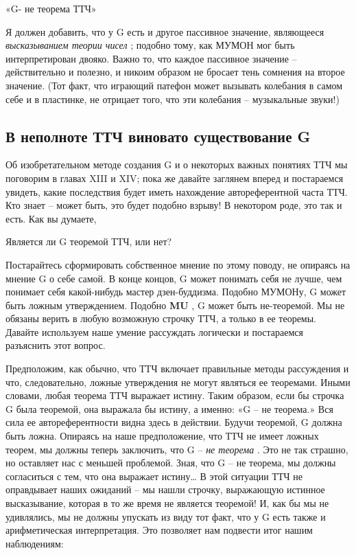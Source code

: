 \documentclass[../main.tex]{subfiles}
\begin{document}
«G- не теорема ТТЧ»

Я должен добавить, что у G есть и другое пассивное значение, являющееся \emph{высказыванием теории чисел} ; подобно тому, как МУМОН мог быть интерпретирован двояко. Важно то, что каждое пассивное значение \--- действительно и полезно, и никоим образом не бросает тень сомнения на второе значение. (Тот факт, что играющий патефон может вызывать колебания в самом себе и в пластинке, не отрицает того, что эти колебания \--- музыкальные звуки!)


\subsection{В неполноте ТТЧ виновато существование G}

Об изобретательном методе создания G и о некоторых важных понятиях ТТЧ мы поговорим в главах XIII и XIV; пока же давайте заглянем вперед и постараемся увидеть, какие последствия будет иметь нахождение автореферентной часта ТТЧ\@. Кто знает \--- может быть, это будет подобно взрыву! В некотором роде, это так и есть. Как вы думаете,

Является ли G теоремой ТТЧ, или нет?

Постарайтесь сформировать собственное мнение по этому поводу, не опираясь на мнение G о себе самой. В конце концов, G может понимать себя не лучше, чем понимает себя какой-нибудь мастер дзен-буддизма. Подобно МУМОНу, G может быть ложным утверждением. Подобно \textbf{MU} , G может быть не-теоремой. Мы не обязаны верить в любую возможную строчку ТТЧ, а только в ее теоремы. Давайте используем наше умение рассуждать логически и постараемся разъяснить этот вопрос.

Предположим, как обычно, что ТТЧ включает правильные методы рассуждения и что, следовательно, ложные утверждения не могут являться ее теоремами. Иными словами, любая теорема ТТЧ выражает истину. Таким образом, если бы строчка G была теоремой, она выражала бы истину, а именно: «G \--- не теорема.» Вся сила ее автореферентности видна здесь в действии. Будучи теоремой, G должна быть ложна. Опираясь на наше предположение, что ТТЧ не имеет ложных теорем, мы должны теперь заключить, что G \--- \emph{не теорема} . Это не так страшно, но оставляет нас с меньшей проблемой. Зная, что G \--- не теорема, мы должны согласиться с тем, что она выражает истину\ldots{} В этой ситуации ТТЧ не оправдывает наших ожиданий \--- мы нашли строчку, выражающую истинное высказывание, которая в то же время не является теоремой! И, как бы мы не удивлялись, мы не должны упускать из виду тот факт, что у G есть также и арифметическая интерпретация. Это позволяет нам подвести итог нашим наблюдениям:
\end{document}
